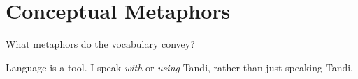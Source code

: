 \chapter{Conceptual Metaphors}
\label{app:conceptual-metaphors}

What metaphors do the vocabulary convey?

Language is a tool. I speak \textit{with} or \textit{using} Tandi, rather than just speaking Tandi.